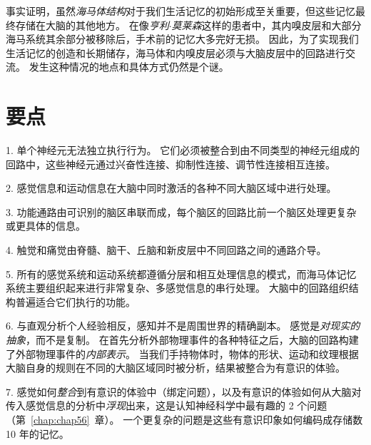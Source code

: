 事实证明，虽然\textit{海马体结构}对于我们生活记忆的初始形成至关重要，但这些记忆最终存储在大脑的其他地方。
在像\textit{亨利$\cdot$莫莱森}这样的患者中，其内嗅皮层和大部分海马系统其余部分被移除后，手术前的记忆大多完好无损。
因此，为了实现我们生活记忆的创造和长期储存，海马体和内嗅皮层必须与大脑皮层中的回路进行交流。
发生这种情况的地点和具体方式仍然是个谜。



\section{要点}

1. 单个神经元无法独立执行行为。
它们必须被整合到由不同类型的神经元组成的回路中，这些神经元通过兴奋性连接、抑制性连接、调节性连接相互连接。


2. 感觉信息和运动信息在大脑中同时激活的各种不同大脑区域中进行处理。


3. 功能通路由可识别的脑区串联而成，每个脑区的回路比前一个脑区处理更复杂或更具体的信息。


4. 触觉和痛觉由脊髓、脑干、丘脑和新皮层中不同回路之间的通路介导。


5. 所有的感觉系统和运动系统都遵循分层和相互处理信息的模式，而海马体记忆系统主要组织起来进行非常复杂、多感觉信息的串行处理。
大脑中的回路组织结构普遍适合它们执行的功能。


6. 与直观分析个人经验相反，感知并不是周围世界的精确副本。
感觉是\textit{对现实的抽象}，而不是复制。
在首先分析外部物理事件的各种特征之后，大脑的回路构建了外部物理事件的\textit{内部表示}。
当我们手持物体时，物体的形状、运动和纹理根据大脑自身的规则在不同的大脑区域同时被分析，结果被整合为有意识的体验。


7. 感觉如何\textit{整合}到有意识的体验中（绑定问题），以及有意识的体验如何从大脑对传入感觉信息的分析中\textit{浮现}出来，这是认知神经科学中最有趣的 2 个问题（第~\ref{chap:chap56}~章）。
一个更复杂的问题是这些有意识印象如何编码成存储数 10 年的记忆。

























